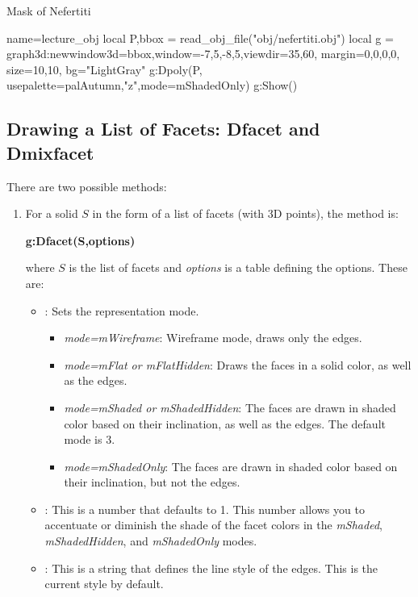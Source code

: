 \begin{demo}{Mask of Nefertiti}
\begin{luadraw}{name=lecture_obj}
local P,bbox = read_obj_file("obj/nefertiti.obj")
local g = graph3d:new{window3d=bbox,window={-7,5,-8,5},viewdir={35,60},
    margin={0,0,0,0}, size={10,10}, bg="LightGray"}
g:Dpoly(P, {usepalette={palAutumn,"z"},mode=mShadedOnly})
g:Show() 
\end{luadraw}
\end{demo}


\subsection{Drawing a List of Facets: Dfacet and Dmixfacet}

There are two possible methods:
\begin{enumerate}
    \item For a solid $S$ in the form of a list of facets (with 3D points), the method is:
\par\hfil\textbf{g:Dfacet(S,options)}\hfil\par
where $S$ is the list of facets and \emph{options} is a table defining the options. These are:
    \begin{itemize}
        \item {}: Sets the representation mode.
            \begin{itemize}
                \item \emph{mode=mWireframe}: Wireframe mode, draws only the edges.
                \item \emph{mode=mFlat or mFlatHidden}: Draws the faces in a solid color, as well as the edges.     \item \emph{mode=mShaded or mShadedHidden}: The faces are drawn in shaded color based on their inclination, as well as the edges. The default mode is 3.
                \item \emph{mode=mShadedOnly}: The faces are drawn in shaded color based on their inclination, but not the edges.
            \end{itemize}
        \item {}: This is a number that defaults to 1. This number allows you to accentuate or diminish the shade of the facet colors in the \emph{mShaded}, \emph{mShadedHidden}, and \emph{mShadedOnly} modes.
        \item {}: This is a string that defines the line style of the edges. This is the current style by default.

\end{itemize}
\end{enumerate}
